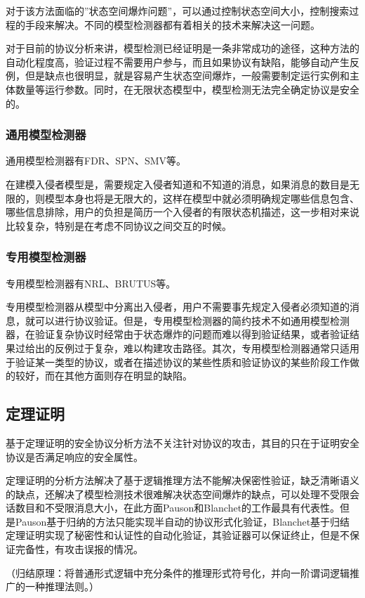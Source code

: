 \documentclass[cs4size,a4pape,UTF8]{ctexart}
\numberwithin{equation}{section}
\numberwithin{table}{section}
\numberwithin{figure}{section}
\begin{document}
对于该方法面临的''状态空间爆炸问题''，可以通过控制状态空间大小，控制搜索过程的手段来解决。不同的模型检测器都有着相关的技术来解决这一问题。

对于目前的协议分析来讲，模型检测已经证明是一条非常成功的途径，这种方法的自动化程度高，验证过程不需要用户参与，而且如果协议有缺陷，能够自动产生反例，但是缺点也很明显，就是容易产生状态空间爆炸，一般需要制定运行实例和主体数量等运行参数。同时，在无限状态模型中，模型检测无法完全确定协议是安全的。

\subsubsection{通用模型检测器}
通用模型检测器有FDR、SPN、SMV等。

在建模入侵者模型是，需要规定入侵者知道和不知道的消息，如果消息的数目是无限的，则模型本身也将是无限大的，这样在模型中就必须明确规定哪些信息包含、哪些信息排除，用户的负担是简历一个入侵者的有限状态机描述，这一步相对来说比较复杂，特别是在考虑不同协议之间交互的时候。

\subsubsection{专用模型检测器}
专用模型检测器有NRL、BRUTUS等。

专用模型检测器从模型中分离出入侵者，用户不需要事先规定入侵者必须知道的消息，就可以进行协议验证。但是，专用模型检测器的简约技术不如通用模型检测器，在验证复杂协议时经常由于状态爆炸的问题而难以得到验证结果，或者验证结果过给出的反例过于复杂，难以构建攻击路径。其次，专用模型检测器通常只适用于验证某一类型的协议，或者在描述协议的某些性质和验证协议的某些阶段工作做的较好，而在其他方面则存在明显的缺陷。


\subsection{定理证明}
基于定理证明的安全协议分析方法不关注针对协议的攻击，其目的只在于证明安全协议是否满足响应的安全属性。

定理证明的分析方法解决了基于逻辑推理方法不能解决保密性验证，缺乏清晰语义的缺点，还解决了模型检测技术很难解决状态空间爆炸的缺点，可以处理不受限会话数目和不受限消息大小，在此方面Pauson和Blanchet的工作最具有代表性。但是Pauson基于归纳的方法只能实现半自动的协议形式化验证，Blanchet基于归结定理证明实现了秘密性和认证性的自动化验证，其验证器可以保证终止，但是不保证完备性，有攻击误报的情况。

（归结原理：将普通形式逻辑中充分条件的推理形式符号化，并向一阶谓词逻辑推广的一种推理法则。）
\end{document}
